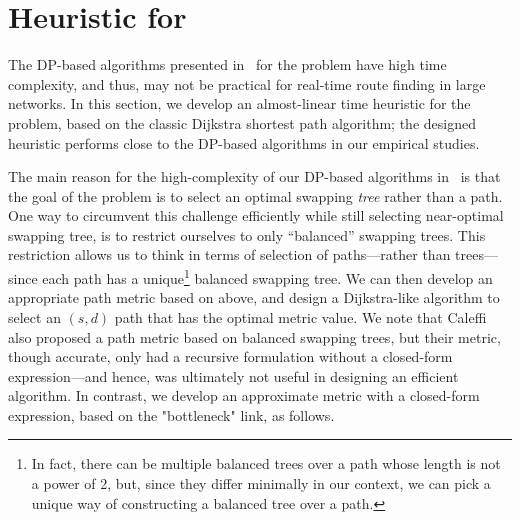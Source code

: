 \section{\dpalt Heuristic for \spp}
\label{sec:swapping_efficient}

The DP-based algorithms presented in~\cite{tqe22-quantum} for the \spp problem
have high time complexity, and thus, may not be practical for real-time route finding in large networks. In this section, we develop an almost-linear time 
heuristic for the \spp problem, based on the classic Dijkstra shortest
path algorithm; the designed heuristic performs close to the DP-based algorithms
in our empirical studies.

The main reason for the high-complexity of our DP-based algorithms
in~\cite{tqe22-quantum} is that
the goal of the \spp problem is to select an optimal swapping \textit{tree} 
rather
than a path. One way to circumvent this challenge efficiently while still
selecting near-optimal swapping tree, is to restrict ourselves to only 
``balanced'' swapping trees. This restriction allows us to think in terms
of selection of paths---rather than trees---since each path has a unique\footnote{In fact, there can be multiple balanced trees over a path whose length is not a power of 2, but, since they differ minimally in our context,
we can pick a unique way of constructing a balanced tree over a path.}
balanced swapping tree.
We can then develop an appropriate path metric based on above, and design
a Dijkstra-like algorithm to select an $(s,d)$ path that has the optimal
metric value.
We note that Caleffi~\cite{caleffi} also proposed a path metric based on 
balanced swapping trees, but their metric, though accurate, only had a
recursive formulation without a closed-form
expression---and hence, was ultimately not useful in designing an efficient
algorithm. In contrast, we develop an approximate
metric with a closed-form expression, 
based on the "bottleneck" link, as follows.

